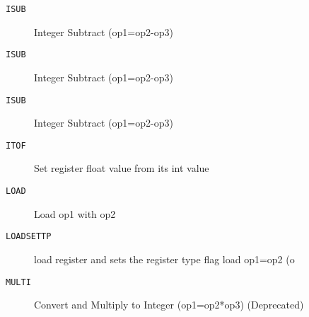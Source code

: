 \begin{description}
\item[\texttt{ISUB       }]  Integer Subtract (op1=op2-op3)\\
\end{description}

\begin{description}
\item[\texttt{ISUB       }]  Integer Subtract (op1=op2-op3)\\
\end{description}

\begin{description}
\item[\texttt{ISUB       }]  Integer Subtract (op1=op2-op3)\\
\end{description}

\begin{description}
\item[\texttt{ITOF       }]  Set register float value from its int value\\
\end{description}

\begin{description}
\item[\texttt{LOAD       }]  Load op1 with op2\\
\end{description}

\begin{description}
\item[\texttt{LOADSETTP  }]  load register and sets the register type flag load op1=op2 (o\\
\end{description}

\begin{description}
\item[\texttt{MULTI      }]  Convert and Multiply to Integer (op1=op2*op3) (Deprecated)\\
\end{description}

